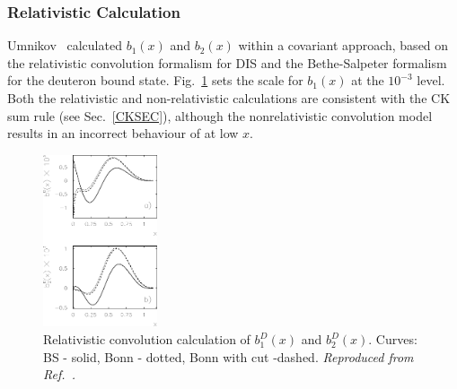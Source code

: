 \subsubsection{Relativistic Calculation}
Umnikov~\cite{Umnikov:1996qv} calculated $b_1(x)$ and $b_2(x)$ within a covariant approach,
based on the relativistic convolution formalism for DIS and the  Bethe-Salpeter formalism 
for the deuteron bound state.  Fig.~\ref{UMNIKOV} sets the scale for $b_1(x)$ at the $10^{-3}$ level.  Both the relativistic and non-relativistic calculations are consistent with the CK sum rule (see Sec.~\ref{CKSEC}), although the nonrelativistic convolution model results in an incorrect behaviour of at low $x$.

\begin{figure}
\begin{center}
\includegraphics[width=0.3\textwidth]{figs/umnikov_b12.eps}
\caption{\label{UMNIKOV} Relativistic convolution calculation of $b_1^D(x)$ and $b_2^D(x)$.  Curves: BS - solid, Bonn - dotted, Bonn with cut -dashed.
{\it Reproduced from Ref.~\cite{Umnikov:1996qv}.}
}
\end{center}
\end{figure}


%
